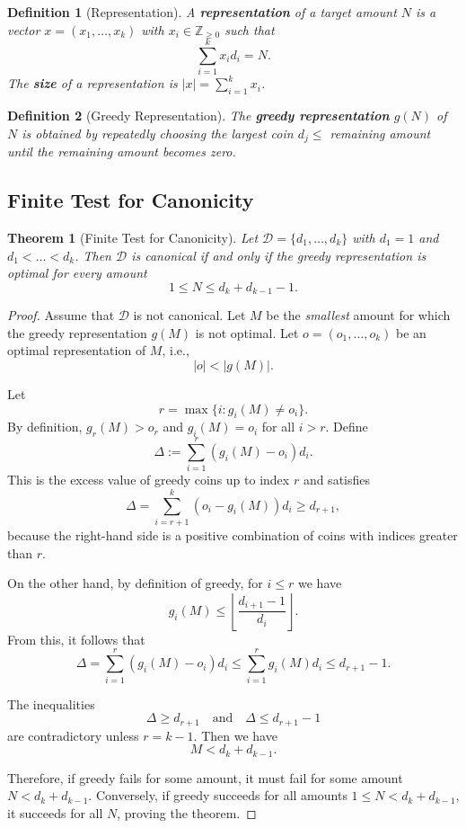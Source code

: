 \documentclass[12pt,a4paper]{report}
\newtheorem{definition}{Definition}
\newtheorem{theorem}{Theorem}
\begin{document}
\begin{definition}[Representation]
A \textbf{representation} of a target amount $N$ is a vector $x = (x_1, \dots, x_k)$ with $x_i \in \mathbb{Z}_{\ge 0}$ such that
\[
\sum_{i=1}^{k} x_i d_i = N.
\]
The \textbf{size} of a representation is $|x| = \sum_{i=1}^{k} x_i$.
\end{definition}

\begin{definition}[Greedy Representation]
The \textbf{greedy representation} $g(N)$ of $N$ is obtained by repeatedly choosing the largest coin $d_j \le$ remaining amount until the remaining amount becomes zero.
\end{definition}

\subsection{Finite Test for Canonicity}

\begin{theorem}[Finite Test for Canonicity]
Let $\mathcal{D} = \{d_1, \dots, d_k\}$ with $d_1 = 1$ and $d_1 < \dots < d_k$. 
Then $\mathcal{D}$ is canonical if and only if the greedy representation is optimal for every amount
\[
1 \le N \le d_k + d_{k-1} - 1.
\]
\end{theorem}

\begin{proof}
Assume that $\mathcal{D}$ is not canonical. Let $M$ be the \textit{smallest} amount for which the greedy representation $g(M)$ is not optimal. Let $o = (o_1, \dots, o_k)$ be an optimal representation of $M$, i.e.,
\[
|o| < |g(M)|.
\]

Let 
\[
r = \max\{ i : g_i(M) \neq o_i \}.
\]
By definition, $g_r(M) > o_r$ and $g_i(M) = o_i$ for all $i > r$. Define
\[
\Delta := \sum_{i=1}^{r} (g_i(M) - o_i)d_i.
\]
This is the excess value of greedy coins up to index $r$ and satisfies
\[
\Delta = \sum_{i=r+1}^{k} (o_i - g_i(M)) d_i \ge d_{r+1},
\]
because the right-hand side is a positive combination of coins with indices greater than $r$.

On the other hand, by definition of greedy, for $i \le r$ we have
\[
g_i(M) \le \left\lfloor \frac{d_{i+1}-1}{d_i} \right\rfloor.
\]
From this, it follows that
\[
\Delta = \sum_{i=1}^{r} (g_i(M) - o_i)d_i \le \sum_{i=1}^{r} g_i(M)d_i \le d_{r+1}-1.
\]

The inequalities
\[
\Delta \ge d_{r+1} \quad \text{and} \quad \Delta \le d_{r+1}-1
\]
are contradictory unless $r = k-1$. Then we have
\[
M < d_k + d_{k-1}.
\]

Therefore, if greedy fails for some amount, it must fail for some amount $N < d_k + d_{k-1}$. Conversely, if greedy succeeds for all amounts $1 \le N < d_k + d_{k-1}$, it succeeds for all $N$, proving the theorem.
\end{proof}
\end{document}
